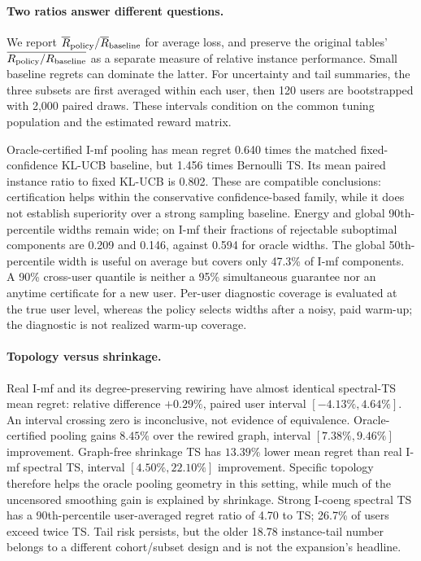\paragraph{Two ratios answer different questions.} We report $\overline{R}_{\rm policy}/\overline{R}_{\rm baseline}$ for average loss, and preserve the original tables' $\overline{R_{\rm policy}/R_{\rm baseline}}$ as a separate measure of relative instance performance. Small baseline regrets can dominate the latter. For uncertainty and tail summaries, the three subsets are first averaged within each user, then 120 users are bootstrapped with 2,000 paired draws. These intervals condition on the common tuning population and the estimated reward matrix.



Oracle-certified I-mf pooling has mean regret 0.640 times the matched fixed-confidence KL-UCB baseline, but 1.456 times Bernoulli TS. Its mean paired instance ratio to fixed KL-UCB is 0.802. These are compatible conclusions: certification helps within the conservative confidence-based family, while it does not establish superiority over a strong sampling baseline. Energy and global 90th-percentile widths remain wide; on I-mf their fractions of rejectable suboptimal components are 0.209 and 0.146, against 0.594 for oracle widths. The global 50th-percentile width is useful on average but covers only 47.3\% of I-mf components. A 90\% cross-user quantile is neither a 95\% simultaneous guarantee nor an anytime certificate for a new user. Per-user diagnostic coverage is evaluated at the true user level, whereas the policy selects widths after a noisy, paid warm-up; the diagnostic is not realized warm-up coverage.

\paragraph{Topology versus shrinkage.} Real I-mf and its degree-preserving rewiring have almost identical spectral-TS mean regret: relative difference $+0.29\%$, paired user interval $[-4.13\%,4.64\%]$. An interval crossing zero is inconclusive, not evidence of equivalence. Oracle-certified pooling gains $8.45\%$ over the rewired graph, interval $[7.38\%,9.46\%]$ improvement. Graph-free shrinkage TS has $13.39\%$ lower mean regret than real I-mf spectral TS, interval $[4.50\%,22.10\%]$ improvement. Specific topology therefore helps the oracle pooling geometry in this setting, while much of the uncensored smoothing gain is explained by shrinkage. Strong I-coeng spectral TS has a 90th-percentile user-averaged regret ratio of 4.70 to TS; 26.7\% of users exceed twice TS. Tail risk persists, but the older 18.78 instance-tail number belongs to a different cohort/subset design and is not the expansion's headline.

